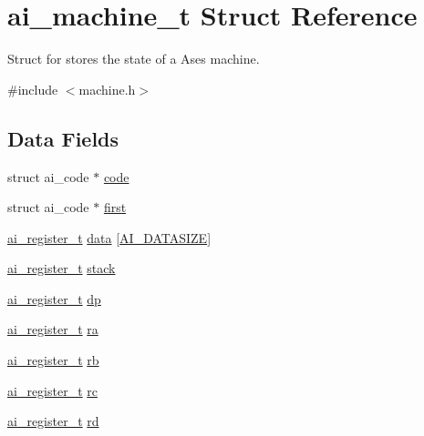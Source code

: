 \hypertarget{structai__machine__t}{}\section{ai\+\_\+machine\+\_\+t Struct Reference}
\label{structai__machine__t}


Struct for stores the state of a Ases machine.  




{\ttfamily \#include $<$machine.\+h$>$}

\subsection*{Data Fields}
\begin{DoxyCompactItemize}
\item 
struct ai\+\_\+code $\ast$ \hyperlink{structai__machine__t_a1802fde997047838d249591ba9fac9e0}{code}
\item 
struct ai\+\_\+code $\ast$ \hyperlink{structai__machine__t_a1d67ad8b87ea88aa540c1c8a3ad155fc}{first}
\item 
\hyperlink{machine_8h_a74ebfc967a5948f22ad4c9dffa32c233}{ai\+\_\+register\+\_\+t} \hyperlink{structai__machine__t_abdf16a0e0f99b24c7b4346a241847501}{data} \mbox{[}\hyperlink{machine_8h_a617e04abe8ee4d0de5f12db1afd8c344}{A\+I\+\_\+\+D\+A\+T\+A\+S\+I\+ZE}\mbox{]}
\item 
\hyperlink{machine_8h_a74ebfc967a5948f22ad4c9dffa32c233}{ai\+\_\+register\+\_\+t} \hyperlink{structai__machine__t_ae5314f51e27da843e45bbbb2907f2b12}{stack}
\item 
\hyperlink{machine_8h_a74ebfc967a5948f22ad4c9dffa32c233}{ai\+\_\+register\+\_\+t} \hyperlink{structai__machine__t_a58f5a8788a72265500bda757e0c7b2c9}{dp}
\item 
\hyperlink{machine_8h_a74ebfc967a5948f22ad4c9dffa32c233}{ai\+\_\+register\+\_\+t} \hyperlink{structai__machine__t_a51fca59a316b5e5d33e4f73fd83f2a14}{ra}
\item 
\hyperlink{machine_8h_a74ebfc967a5948f22ad4c9dffa32c233}{ai\+\_\+register\+\_\+t} \hyperlink{structai__machine__t_a21915af77692f8928820333544ef7e09}{rb}
\item 
\hyperlink{machine_8h_a74ebfc967a5948f22ad4c9dffa32c233}{ai\+\_\+register\+\_\+t} \hyperlink{structai__machine__t_a40399a0935ea85fde6add5674e5eb842}{rc}
\item 
\hyperlink{machine_8h_a74ebfc967a5948f22ad4c9dffa32c233}{ai\+\_\+register\+\_\+t} \hyperlink{structai__machine__t_a8e167d72ded50101fdd73c000cf9935d}{rd}
\end{DoxyCompactItemize}


